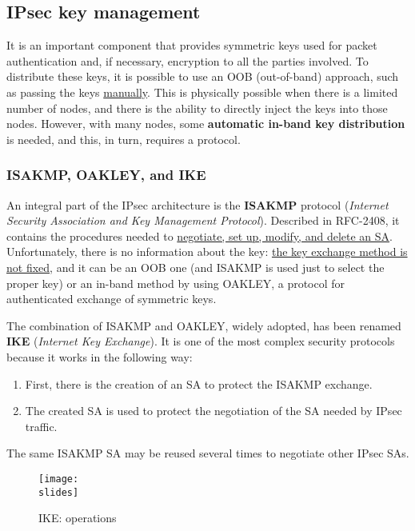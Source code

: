 \subsection{IPsec key management}
It is an important component that provides symmetric keys used for packet authentication and, if necessary, encryption to all the parties involved. To distribute these keys, it is possible to use an OOB (out-of-band) approach, such as passing the keys \underline{manually}. This is physically possible when there is a limited number of nodes, and there is the ability to directly inject the keys into those nodes. However, with many nodes, some \textbf{automatic in-band key distribution} is needed, and this, in turn, requires a protocol.


\subsubsection{ISAKMP, OAKLEY, and IKE}
An integral part of the IPsec architecture is the \textbf{ISAKMP} protocol (\textit{Internet Security Association and Key Management Protocol}). Described in RFC-2408, it contains the procedures needed to \ul{negotiate, set up, modify, and delete an SA}.
Unfortunately, there is no information about the key: \underline{the key exchange method is not fixed}, and it can be an OOB one (and ISAKMP is used just to select the proper key) or an in-band method by using OAKLEY, a protocol for authenticated exchange of symmetric keys.

The combination of ISAKMP and OAKLEY, widely adopted, has been renamed \textbf{IKE} (\textit{Internet Key Exchange}). It is one of the most complex security protocols because it works in the following way:

\begin{enumerate}
    \item First, there is the creation of an SA to protect the ISAKMP exchange.
    \item The created SA is used to protect the negotiation of the SA needed by IPsec traffic.
\end{enumerate}
The same ISAKMP SA may be reused several times to negotiate other IPsec SAs.


\begin{figure}[h]
    \centering
    \texttt{[image: \\slides]}
    \caption{IKE: operations}
    \label{fig:IKE-operations}
\end{figure}

